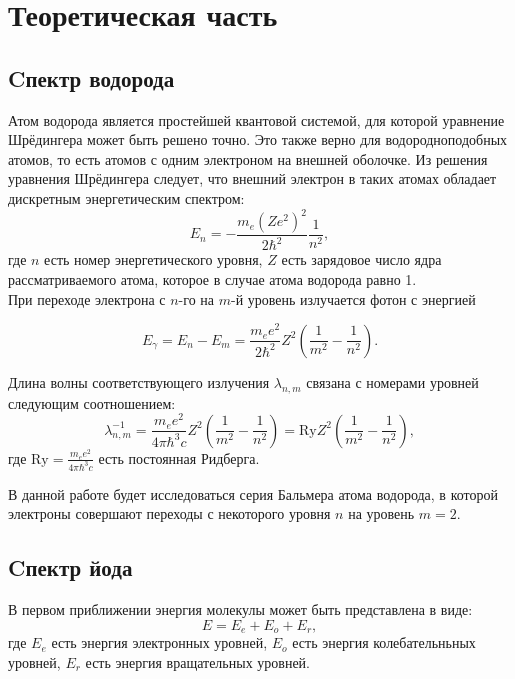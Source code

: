 \section{Теоретическая часть}

        \subsection{Cпектр водорода}
        
        Атом водорода является простейшей квантовой системой, для которой уравнение Шрёдингера может быть решено точно. Это также верно для водородноподобных атомов, то есть атомов с одним электроном на внешней оболочке. Из решения уравнения Шрёдингера следует, что внешний электрон в таких атомах обладает дискретным энергетическим спектром:  
        \begin{equation}
            E_n = - \frac{m_e (Z e^2)^2}{2\hbar^2}\frac{1}{n^2},
        \end{equation}
        где $n$ есть номер энергетического уровня, $Z$ есть зарядовое число ядра рассматриваемого атома, которое в случае атома водорода равно 1.\\
        При переходе электрона с $n$-го на $m$-й уровень излучается фотон с энергией
        
		\begin{equation}
            E_\gamma = E_n - E_m = \frac{m_ee^2}{2\hbar^2}Z^2\left(\frac{1}{m^2} - \frac{1}{n^2}\right).
        \end{equation}
        
		Длина волны  соответствующего излучения $\lambda_{n,m}$ связана с номерами уровней следующим соотношением:
        \begin{equation}
            \label{eq:Ry}
            \lambda_{n,m}^{-1} =\frac{m_ee^2}{4\pi\hbar^3c}Z^2\left(\frac{1}{m^2}-\frac{1}{n^2}\right) = \text{Ry} Z^2 \left(\frac{1}{m^2}-\frac{1}{n^2}\right),
        \end{equation}
        где $\text{Ry} = \frac{m_ee^2}{4\pi\hbar^3c}$ есть постоянная Ридберга.

        В данной работе будет исследоваться серия Бальмера атома водорода, в которой электроны совершают переходы с некоторого уровня $n$ на уровень $m = 2$.


        \subsection{Cпектр йода}
        В первом приближении энергия молекулы может быть представлена в виде:
        \begin{equation}
            E=E_e+E_o+E_r,
        \end{equation}
        где $E_e$ есть энергия электронных уровней, $E_o$ есть энергия колебательньных уровней, $E_r$ есть энергия вращательных уровней.

